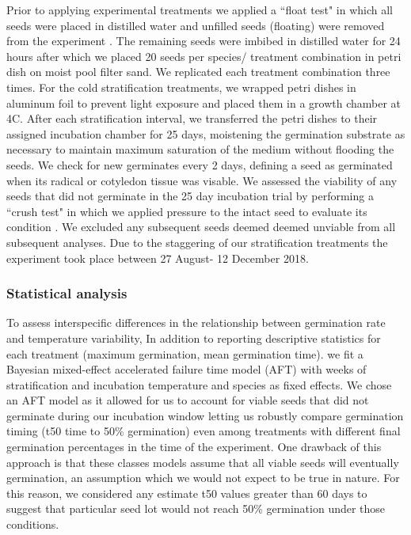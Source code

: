\documentclass{article}\usepackage[]{graphicx}\usepackage[]{color}
\begin{document}
\noindent  Prior to applying experimental treatments we applied a ``float test" in which all seeds were placed in distilled water and unfilled seeds (floating) were removed from the experiment \citep{Baskin2014}. The remaining seeds were imbibed in distilled water for 24 hours after which we placed 20 seeds per species/ treatment combination in petri dish on moist pool filter sand. We replicated each treatment combination three times. For the cold stratification treatments, we wrapped petri dishes in aluminum foil to prevent light exposure and placed them in a growth chamber at 4\degree C. After each stratification interval, we transferred the petri dishes to their assigned incubation chamber for 25 days, moistening the germination substrate as necessary to maintain maximum saturation of the medium without flooding the seeds. We check for new germinates every 2 days, defining a seed as germinated when its radical or cotyledon tissue was visable\citep{Baskin2014}. We assessed the viability of any seeds that did not germinate in the 25 day incubation trial by performing a ``crush test" in which we applied pressure to the intact seed to evaluate its condition \citep{Baskin2014}. We excluded any subsequent seeds deemed deemed unviable from all subsequent analyses. Due to the staggering of our stratification treatments the experiment took place between 27 August- 12 December 2018.\\

\subsubsection*{Statistical analysis}
To assess interspecific differences in the relationship between germination rate and temperature variability, In addition to reporting descriptive statistics for each treatment (maximum germination, mean germination time). we fit a Bayesian mixed-effect accelerated failure time model (AFT) with weeks of stratification and incubation temperature and species as fixed effects.  We chose an AFT model as it allowed for us to account for viable seeds that did not germinate during our incubation window letting us robustly compare germination timing (t50 time to 50\% germination) even among treatments with different final germination percentages in the time of the experiment\citep{Soltani:2015aa}. One drawback of this approach is that these classes models assume that all viable seeds will eventually germination, an assumption which we would not expect to be true in nature. For this reason, we considered any estimate t50 values greater than 60 days to suggest that particular seed lot would not reach 50\% germination under those conditions.\\ %
\end{document}
